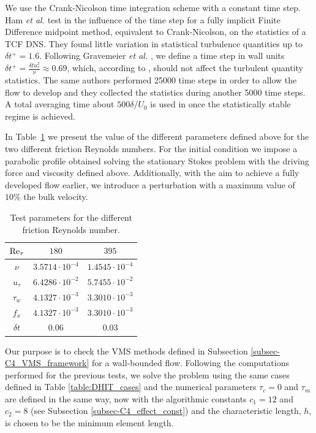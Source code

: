 We use the Crank-Nicolson time integration scheme with a constant time step. Ham \emph{et al.}  test in \cite{ham_fully_2002} the influence of the time step for a fully implicit Finite Difference midpoint method, equivalent to Crank-Nicolson, on the statistics of a TCF DNS. They found little variation in statistical turbulence quantities up to $\delta t^+=1.6$. Following Gravemeier \emph{et al.} \cite{gravemeier_algebraic_2010}, we define a time step in wall units $\delta t^+=\frac{\delta tu_\tau^2}{\nu}\approx0.69$, which, according to \cite{ham_fully_2002}, should not affect the turbulent quantity statistics. The same authors performed 25000 time steps in order to allow the flow to develop and they collected the statistics during another 5000 time steps. A total averaging time about $500\delta/U_0$ is used in \cite{choi_effects_1994} once the statistically stable regime is achieved.

In Table~\ref{table:Channel_parameters} we present the value of the different parameters defined above for the two different friction Reynolds numbers. For the initial condition we impose a parabolic profile obtained solving the stationary Stokes problem with the driving force and viscosity defined above. Additionally, with the aim to achieve a fully developed flow earlier, we introduce a perturbation with a maximum value of $10\%$ the bulk velocity.

\begin{table}[h!]
\centering
\begin{tabular}{ccc}
\toprule
${\rm Re}_\tau$&$180$&$395$\\
\midrule
\midrule
$\nu$&$3.5714\cdot10^{-4}$&$1.4545\cdot10^{-4}$\\
$u_\tau$&$6.4286\cdot10^{-2}$&$5.7455\cdot10^{-2}$\\
$\tau_w$&$4.1327\cdot10^{-3}$&$3.3010\cdot10^{-3}$\\
$f_x$&$4.1327\cdot10^{-3}$&$3.3010\cdot10^{-3}$\\
$\delta t$&$0.06$&$0.03$\\
\bottomrule
\end{tabular}
\caption{Test parameters for the different friction Reynolds number.}
\label{table:Channel_parameters}
\end{table}

Our purpose is to check the VMS methods defined in Subsection \ref{subsec-C4_VMS_framework} for a wall-bounded flow. Following the computations performed for the previous tests, we solve the problem using the same cases defined in Table \ref{table:DHIT_cases} and the numerical parameters $\tau_c=0$ and $\tau_m$ are defined in the same way, now with the algorithmic constants  $c_1=12$ and $c_2=8$ (see Subsection \ref{subsec-C4_effect_const}) and the characteristic length, $h$, is chosen to be the minimum element length. 

